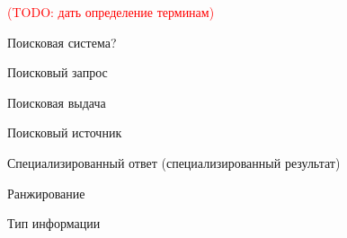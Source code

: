 \documentclass[12pt,a4paper]{report}
\newcommand\note[1]{\textcolor{red}{(#1)}}
\newcommand\todonote[1]{\note{TODO: #1}}
\begin{document}
\todonote{дать определение терминам}

Поисковая система?

Поисковый запрос

Поисковая выдача


Поисковый источник

Специализированный ответ (специализированный результат)

Ранжирование

Тип информации
\end{document}
